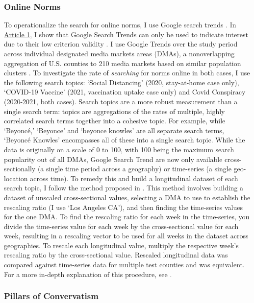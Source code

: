 \hypertarget{online-norms}{\subsubsection{Online Norms}\label{online-norms}}

To operationalize the search for online norms, I use Google search trends
\citep{googletrends}. In \hyperlink{paper-1}{Article 1}, I show
that Google Search Trends can only be used to indicate interest due to their low
criterion validity \citep{jungherr_etal17}. I use Google Trends over the study
period across individual designated media markets areas (DMAs), a nonoverlapping
aggregation of U.S. counties to 210 media markets based on similar population
clusters \citep{dma_key}. To investigate the rate of \emph{searching} for norms
online in both cases, I use the following search topics: `Social Distancing'
(2020, stay-at-home case only), `COVID-19 Vaccine' (2021, vaccination uptake
case only) and Covid Conspiracy (2020-2021, both cases). Search topics are a
more robust measurement than a single search term: topics are aggregations of
the rates of multiple, highly correlated search terms together into a cohesive
topic. For example, while `Beyoncé,' `Beyonce' and `beyonce knowles' are all
separate search terms, `Beyoncé Knowles' encompasses all of these into a single
search topic. While the data is originally on a scale of 0 to 100, with 100
being the maximum search popularity out of all DMAs, Google Search Trend are now
only available cross-sectionally (a single time period across a geography) or
time-series (a single geo-location across time). To remedy this and build a
longitudinal dataset of each search topic, I follow the method proposed in
\citet[p. 5]{park_etal}. This method involves building a dataset of unscaled
cross-sectional values, selecting a DMA to use to establish the rescaling ratio
(I use `Los Angeles CA'), and then finding the time-series values for the one
DMA. To find the rescaling ratio for each week in the time-series, you divide
the time-series value for each week by the cross-sectional value for each week,
resulting in a rescaling vector to be used for all weeks in the dataset across
geographies. To rescale each longitudinal value, multiply the respective week's
rescaling ratio by the cross-sectional value. Rescaled longitudinal data was
compared against time-series data for multiple test counties and was equivalent.
For a more in-depth explanation of this procedure, see \citet[p. 5]{park_etal}.

\hypertarget{pillars-of-convervatism}{%
\subsubsection{Pillars of Convervatism}\label{pillars-of-convervatism}}

